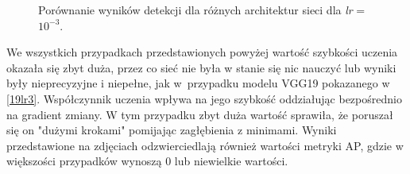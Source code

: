 \begin{figure}[H]
    \centering
        \hfill
    \end{figure}
    \begin{figure}[H]\ContinuedFloat
    \centering
        \hfill
    \caption{Porównanie wyników detekcji dla różnych architektur sieci dla \emph{lr} = $10^{-3}$.}
    \label{fig:lr_porównanie_3_zdj}
\end{figure}

\hspace{0.5cm}
We wszystkich przypadkach przedstawionych powyżej wartość szybkości uczenia okazała się zbyt duża, przez co sieć nie była w stanie się nic nauczyć lub wyniki były nieprecyzyjne i niepełne, jak w~przypadku modelu VGG19 pokazanego w \ref{19lr3}. Współczynnik uczenia wpływa na jego szybkość oddziałując bezpośrednio na gradient zmiany. W tym przypadku zbyt duża wartość sprawiła, że poruszał się on "dużymi krokami" pomijając zagłębienia z minimami. Wyniki przedstawione na zdjęciach odzwierciedlają również wartości metryki AP, gdzie w większości przypadków wynoszą 0 lub niewielkie wartości.

